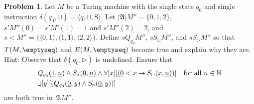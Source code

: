 \documentclass[10pt,a4paper]{article}
\theoremstyle{plain}
\theoremstyle{definition}
\newtheorem{prob}{Problem}[section]
\theoremstyle{remark}
\newenvironment{explain}{}{}
\providecommand{\lif}{\mathbin{\rightarrow}}
\providecommand{\lforall}{\mathord{\forall}}
\providecommand{\lexists}{\mathord{\exists}}
\providecommand{\Obj}{}
\providecommand{\Struct}{\ensuremath{\mathfrak{A}}}
\providecommand{\Domain}{\ensuremath{|\mathfrak{A}|}}
\providecommand{\Assign}{\ensuremath{s}}
\providecommand{\tuple}[1]{\langle #1 \rangle}
\providecommand{\num}[1]{\underline{#1}}
\providecommand{\Nat}{\ensuremath{\mathbb{N}}}
\providecommand{\TMblank}{\sqcup}
\providecommand{\TMstay}{\mathrm{S}}
\providecommand{\TMendtape}{\triangleright}
\begin{document}
\begin{explain}
  \begin{prob}
    Let $M$ be a Turing machine with the single state $q_0$ and single
    instruction $\delta(q_0,\TMblank) = \tuple{q,\TMblank,\TMstay}$.
    Let $\Domain{M''} = \{0, 1, 2\}$, $\Assign{\prime}{M''}(0) =
    \Assign{\prime}{M'}(1) = 1$ and $\Assign{\prime}{M''}(2) = 2$, and
    $\Assign{<}{M''} = \{\tuple{0,1}, \tuple{1,1}, \tuple{2,2}\}$.
    Define $\Assign{\Obj Q_{q_0}}{M''}$, $\Assign{\Obj
    S_{\TMblank}}{M''}$, and $\Assign{\Obj S_{\TMendtape}}{M''}$ so
    that $T(M,\emptyseq)$ and $E(M,\emptyseq)$ become true and
    explain why they are. Hint: Observe that $\delta(q_0, \TMendtape)$
    is undefined. Ensure that
    \begin{align*}
    & \Obj Q_{q_0}(\num{1}, \num{n}) \land \Obj S_{\TMendtape}(\num{0}, \num{n})
      \land 
      \lforall[x][(\num{0} < x \lif \Obj S_\TMblank(x, \num{n}))] \text{\quad for all $n \in \Nat$}\\
    & \lexists[y][(\Obj Q_{q_0}(\num{0}, y) \land \Obj S_{\TMendtape}(\num{0}, y))]
    \end{align*}
    are both true in~$\Struct{M''}$.
  \end{prob}
\end{explain}
\end{document}
